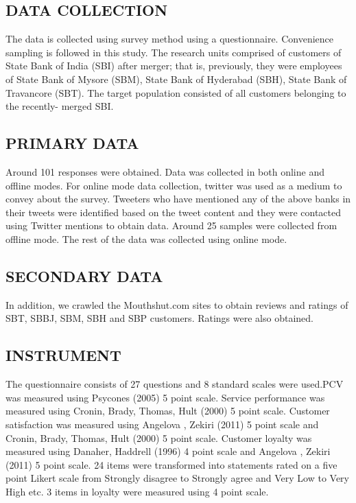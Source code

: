 \documentclass[a4paper, 14pt]{extarticle}
\begin{document}
{\subsection{DATA COLLECTION}
\par The data is collected using survey method using a questionnaire. Convenience sampling is followed in this study. The research units comprised of customers of State Bank of India (SBI) after merger; that is, previously, they were employees of State Bank of Mysore (SBM), State Bank of Hyderabad (SBH), State Bank of Travancore (SBT). The target population consisted of all customers belonging to the recently- merged SBI. 
\subsection{PRIMARY DATA}
\par Around 101 responses were obtained. Data was collected in both online and offline modes. For online mode data collection, twitter was used as a medium to convey about the survey. Tweeters who have mentioned any of the above banks in their tweets were identified based on the tweet content and they were contacted using Twitter mentions to obtain data. Around 25 samples were collected from offline mode. The rest of the data was collected using online mode.
\subsection{SECONDARY DATA}
In addition, we crawled the Mouthshut.com sites to obtain reviews and ratings of SBT, SBBJ, SBM, SBH and SBP customers. Ratings were also obtained.

\subsection{INSTRUMENT}
The questionnaire consists of 27 questions and 8 standard scales were used.PCV was measured using Psycones (2005)  5 point scale. Service performance was measured using Cronin, Brady, Thomas, Hult (2000)  5 point scale. Customer satisfaction was measured using 
Angelova , Zekiri (2011)  5 point scale and Cronin, Brady, Thomas, Hult (2000)  5 point scale. Customer loyalty was measured using Danaher, Haddrell (1996) 4 point scale and Angelova , Zekiri (2011) 5 point scale. 24 items were transformed into statements rated on a five  point Likert scale from Strongly disagree to Strongly agree and Very Low to Very High etc. 3 items in loyalty were measured using 4 point scale.

}
\end{document}
